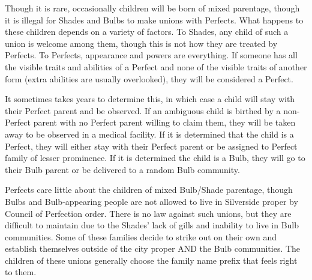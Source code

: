 \documentclass[blue]{Silversiders}
\begin{document}
Though it is rare, occasionally children will be born of mixed parentage, though it is illegal for Shades and Bulbs to make unions with Perfects. What happens to these children depends on a variety of factors. 
To Shades, any child of such a union is welcome among them, though this is not how they are treated by Perfects. To Perfects, appearance and powers are everything. If someone has all the visible traits and abilities of a Perfect and none of the visible traits of another form (extra abilities are usually overlooked), they will be considered a Perfect. 

It sometimes takes years to determine this, in which case a child will stay with their Perfect parent and be observed. If an ambiguous child is birthed by a non-Perfect parent with no Perfect parent willing to claim them, they will be taken away to be observed in a medical facility. If it is determined that the child is a Perfect, they will either stay with their Perfect parent or be assigned to Perfect family of lesser prominence. If it is determined the child is a Bulb, they will go to their Bulb parent or be delivered to a random Bulb community.

Perfects care little about the children of mixed Bulb/Shade parentage, though Bulbs and Bulb-appearing people are not allowed to live in Silverside proper by Council of Perfection order. There is no law against such unions, but they are difficult to maintain due to the Shades' lack of gills and inability to live in Bulb communities. Some of these families decide to strike out on their own and establish themselves outside of the city proper AND the Bulb communities. The children of these unions generally choose the family name prefix that feels right to them.
\end{document}
